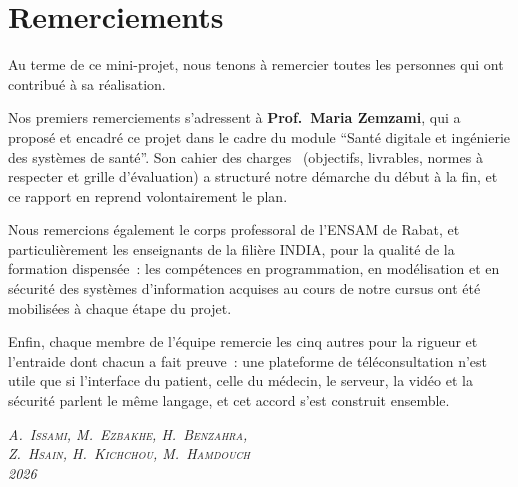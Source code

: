 \chapter*{Remerciements}

Au terme de ce mini-projet, nous tenons à remercier toutes les personnes qui ont contribué à sa réalisation.

Nos premiers remerciements s'adressent à \textbf{Prof.~Maria Zemzami}, qui a proposé et encadré ce projet dans le cadre du module \enquote{Santé digitale et ingénierie des systèmes de santé}. Son cahier des charges~\cite{zemzami2026} (objectifs, livrables, normes à respecter et grille d'évaluation) a structuré notre démarche du début à la fin, et ce rapport en reprend volontairement le plan.

Nous remercions également le corps professoral de l'\ac{ENSAM} de Rabat, et particulièrement les enseignants de la filière \ac{INDIA}, pour la qualité de la formation dispensée~: les compétences en programmation, en modélisation et en sécurité des systèmes d'information acquises au cours de notre cursus ont été mobilisées à chaque étape du projet.

Enfin, chaque membre de l'équipe remercie les cinq autres pour la rigueur et l'entraide dont chacun a fait preuve~: une plateforme de téléconsultation n'est utile que si l'interface du patient, celle du médecin, le serveur, la vidéo et la sécurité parlent le même langage, et cet accord s'est construit ensemble.

\vspace{2cm}
\begin{flushright}
\textit{A.~\textsc{Issami}, M.~\textsc{Ezbakhe}, H.~\textsc{Benzahra},}\\
\textit{Z.~\textsc{Hsain}, H.~\textsc{Kichchou}, M.~\textsc{Hamdouch}}\\
\textit{2026}
\end{flushright}
